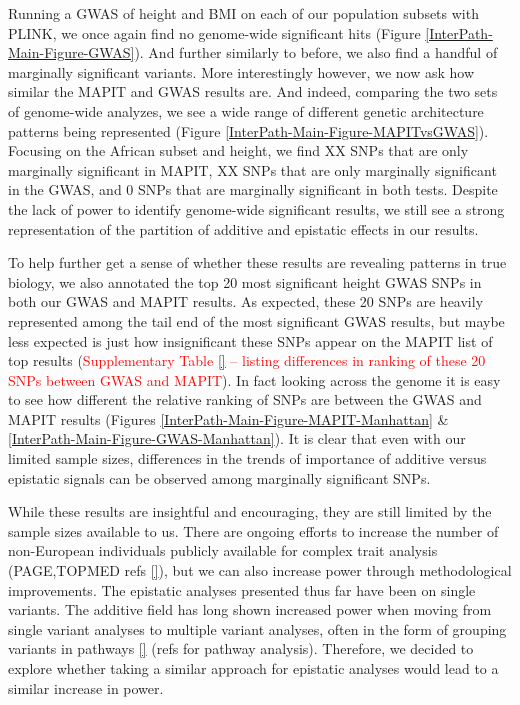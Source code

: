 \documentclass[12pt, a4paper]{article}
\begin{document}
Running a GWAS of height and BMI on each of our population subsets with PLINK, we once again find no genome-wide significant hits (Figure \ref{InterPath-Main-Figure-GWAS}). And further similarly to before, we also find a handful of marginally significant variants. More interestingly however, we now ask how similar the MAPIT and GWAS results are. And indeed, comparing the two sets of genome-wide analyzes, we see a wide range of different genetic architecture patterns being represented (Figure \ref{InterPath-Main-Figure-MAPITvsGWAS}). Focusing on the African subset and height, we find XX SNPs that are only marginally significant in MAPIT, XX SNPs that are only marginally significant in the GWAS, and 0 SNPs that are marginally significant in both tests. Despite the lack of power to identify genome-wide significant results, we still see a strong representation of the partition of additive and epistatic effects in our results. 

To help further get a sense of whether these results are revealing patterns in true biology, we also annotated the top 20 most significant height GWAS SNPs in both our GWAS and MAPIT results. As expected, these 20 SNPs are heavily represented among the tail end of the most significant GWAS results, but maybe less expected is just how insignificant these SNPs appear on the MAPIT list of top results (\textcolor{red}{Supplementary Table \ref{} -- listing differences in ranking of these 20 SNPs between GWAS and MAPIT}). In fact looking across the genome it is easy to see how different the relative ranking of SNPs are between the GWAS and MAPIT results (Figures \ref{InterPath-Main-Figure-MAPIT-Manhattan} \& \ref{InterPath-Main-Figure-GWAS-Manhattan}). It is clear that even with our limited sample sizes, differences in the trends of importance of additive versus epistatic signals can be observed among marginally significant SNPs.  

While these results are insightful and encouraging, they are still limited by the sample sizes available to us. There are ongoing efforts to increase the number of non-European individuals publicly available for complex trait analysis (PAGE,TOPMED refs \ref{}), but we can also increase power through methodological improvements. The epistatic analyses presented thus far have been on single variants. The additive field has long shown increased power when moving from single variant analyses to multiple variant analyses, often in the form of grouping variants in pathways \ref{} (refs for pathway analysis). Therefore, we decided to explore whether taking a similar approach for epistatic analyses would lead to a similar increase in power.
\end{document}
